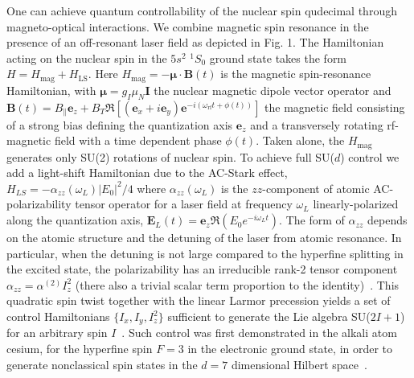 \documentclass[aps,prl,twocolumn,reprint,superscriptaddress,footinbib]{revtex4-2}
\begin{document}
One can achieve quantum controllability of the nuclear spin qudecimal  through magneto-optical interactions.  We combine magnetic spin resonance in the presence of an off-resonant laser field as depicted in Fig. 1.  The Hamiltonian acting on the nuclear spin in the $5s^2$ $^1S_0$ ground state takes the form $H=H_{\mathrm{mag}} +H_{\mathrm{LS}}$. Here $H_{\mathrm{mag}} = -\boldsymbol{\mu}\cdot \mathbf{B}(t)$ is the magnetic spin-resonance Hamiltonian, with $\boldsymbol{\mu} = g_I \mu_N \mathbf{I}$ the nuclear magnetic dipole vector operator and $\mathbf{B}(t) = B_\parallel \mathbf{e}_z + B_T \Re\left[(\mathbf{e}_x + i \mathbf{e}_y) \mathbf{e}^{-i\left(\omega_\text{rf} t +\phi(t)\right)}\right]$ the magnetic field consisting of a strong bias defining the quantization axis $\mathbf{e}_z$ and a transversely rotating rf-magnetic field with a time dependent phase $\phi(t)$. Taken alone, the $H_{\mathrm{mag}}$ generates only SU(2) rotations of nuclear spin.  To achieve full SU($d$) control we add a light-shift Hamiltonian due to the AC-Stark effect, $H_{LS}=-\alpha_{zz}(\omega_L) \left| E_0 \right|^2/4$ where $\alpha_{zz}(\omega_L)$ is the $zz$-component of atomic AC-polarizability tensor operator for a laser field at frequency $\omega_L$ linearly-polarized along the quantization axis, $\mathbf{E}_L(t) = \mathbf{e}_z \Re \left(E_0 e^{-i\omega_L t}\right)$. The form of $\alpha_{zz}$ depends on the atomic structure and the detuning of the laser from atomic resonance.  In particular, when the detuning is not large compared to the hyperfine splitting in the excited state, the polarizability has an irreducible rank-2 tensor component $\alpha_{zz} = \alpha^{(2)} I_z^2$ (there also a trivial scalar term proportion to the identity)~\cite{deutsch2010quantum}.  This quadratic spin twist together with the linear Larmor precession yields a set of control Hamiltonians $\{I_x, I_y, I_z^2\}$ sufficient to generate the Lie algebra SU($2I+1$) for an arbitrary spin $I$~\cite{Giorda2003}.  Such control was first demonstrated in the alkali atom cesium, for the hyperfine spin $F=3$ in the electronic ground state, in order to generate nonclassical spin states in the $d=7$ dimensional Hilbert space~\cite{Chaudhury2007}.  
\end{document}
